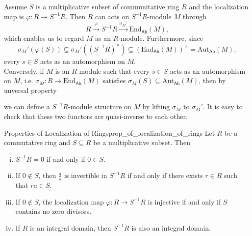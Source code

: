 \begin{prf}
    Assume $S$ is a multiplicative subset of communitative ring $R$ and the localization map is $\varphi:R\to S^{-1}R$. Then $R$ can acts on $S^{-1}R$-module $M$ through 
    \[
        R\xrightarrow{\varphi}S^{-1}R\xrightarrow{\sigma_M'}\mathrm{End}_{\mathsf{Ab}}(M),
    \]
    which enables us to regard $M$ as an $R$-module. Furthermore, since 
    \[
        \sigma_M'(\varphi(S))\subseteq \sigma_M' \left(\left(S^{-1}R\right)^\times\right)\subseteq \left(\mathrm{End}_{\mathsf{Ab}}(M)\right)^\times=\mathrm{Aut}_{\mathsf{Ab}}(M),
    \]
    every $s \in S$ acts as an automorphism on $M$.\\
    Conversely, if $M$ is an $R$-module such that every $s\in S$ acts as an automorphism on $M$, i.e. $\sigma_M:R\to\mathrm{End}_{\mathsf{Ab}}(M)$ satisfies $\sigma_M(S)\subseteq \mathrm{Aut}_{\mathsf{Ab}}(M)$, then by unversal property
    \begin{center}
    \end{center}
    we can define a $S^{-1}R$-module structure on $M$ by lifting $\sigma_M$ to $\sigma_M'$. It is easy to check that these two functors are quasi-inverse to each other.
\end{prf}

\begin{proposition}{Properties of Localization of Rings}{prop_of_localization_of_rings}
    Let $R$ be a commutative ring and $S\subseteq R$ be a multiplicative subset. Then
    \begin{enumerate}[(i)]
        \item $S^{-1}R=0$ if and only if $0\in S$.
        \item If $0\notin S$, then $\frac{a}{s}$ is invertible in $S^{-1}R$ if and only if there exists $r\in R$ such that $ra\in S$.
        \item If $0\notin S$, the localization map $\varphi:R\to S^{-1}R$ is injective if and only if $S$ contains no zero divisors.
        \item If $R$ is an integral domain, then $S^{-1}R$ is also an integral domain.
    \end{enumerate}
\end{proposition}

